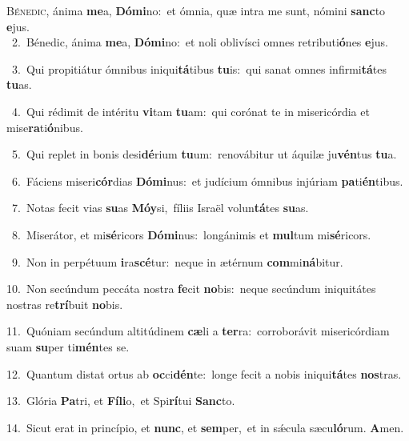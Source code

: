 \lettrine{\initial\textcolor{\initialcolor}{B}}{énedic,} ánima \textbf{me}\-a, \textbf{Dó}\-\textbf{mi}no:~\star et ómnia, quæ intra me sunt, nómini \textbf{sanc}\-to \textbf{e}\-jus.\\
{\numbfont\textcolor{\numbcolor}{~2.}}~Bénedic, ánima \textbf{me}\-a, \textbf{Dó}\-\textbf{mi}no:~\star et noli oblivísci omnes retributi\-\textbf{ó}\-nes \textbf{e}\-jus.\par
{\numbfont\textcolor{\numbcolor}{~3.}}~Qui propitiátur ómnibus iniqui\-\textbf{tá}\-tibus \textbf{tu}\-is:~\star qui sanat omnes infirmi\-\textbf{tá}\-tes \textbf{tu}\-as.\par
{\numbfont\textcolor{\numbcolor}{~4.}}~Qui rédimit de intéritu \textbf{vi}\-tam \textbf{tu}\-am:~\star qui corónat te in misericórdia et mise\-\textbf{ra}\-ti\-\textbf{ó}\-nibus.\par
{\numbfont\textcolor{\numbcolor}{~5.}}~Qui replet in bonis desi\-\textbf{dé}\-rium \textbf{tu}\-um:~\star renovábitur ut áquilæ ju\-\textbf{vén}\-tus \textbf{tu}\-a.\par
{\numbfont\textcolor{\numbcolor}{~6.}}~Fáciens miseri\-\textbf{cór}\-dias \textbf{Dó}\-\textbf{mi}nus:~\star et judícium ómnibus injúriam \textbf{pa}\-ti\-\textbf{én}\-tibus.\par
{\numbfont\textcolor{\numbcolor}{~7.}}~Notas fecit vias \textbf{su}\-as \textbf{Mó}\-\textbf{y}si,~\star fíliis Israël volun\-\textbf{tá}\-tes \textbf{su}\-as.\par
{\numbfont\textcolor{\numbcolor}{~8.}}~Miserátor, et mi\-\textbf{sé}\-ricors \textbf{Dó}\-\textbf{mi}nus:~\star longánimis et \textbf{mul}\-tum mi\-\textbf{sé}\-ricors.\par
{\numbfont\textcolor{\numbcolor}{~9.}}~Non in perpétuum \textbf{i}\-ra\-\textbf{scé}\-tur:~\star neque in ætérnum \textbf{com}\-mi\-\textbf{ná}\-bitur.\par
{\numbfont\textcolor{\numbcolor}{10.}}~Non secúndum peccáta nostra \textbf{fe}\-cit \textbf{no}\-bis:~\star neque secúndum iniquitátes nostras re\-\textbf{trí}\-buit \textbf{no}\-bis.\par
{\numbfont\textcolor{\numbcolor}{11.}}~Quóniam secúndum altitúdinem \textbf{cæ}\-li a \textbf{ter}\-ra:~\star corroborávit misericórdiam suam \textbf{su}\-per ti\-\textbf{mén}\-tes se.\par
{\numbfont\textcolor{\numbcolor}{12.}}~Quantum distat ortus ab \textbf{oc}\-ci\-\textbf{dén}\-te:~\star longe fecit a nobis iniqui\-\textbf{tá}\-tes \textbf{nos}\-tras.\par
{\numbfont\textcolor{\numbcolor}{13.}}~Glória \textbf{Pa}\-tri, et \textbf{Fí}\-\textbf{li}o,~\star et Spi\-\textbf{rí}\-tui \textbf{Sanc}\-to.\par
{\numbfont\textcolor{\numbcolor}{14.}}~Sicut erat in princípio, et \textbf{nunc}\-, et \textbf{sem}\-per,~\star et in sǽcula sæcu\-\textbf{ló}\-rum. \textbf{A}\-men.\par
